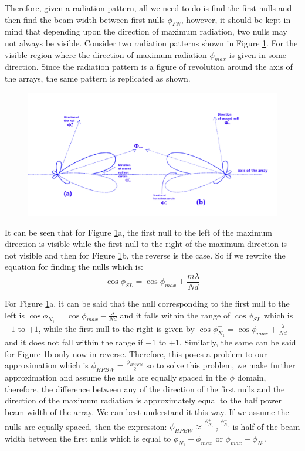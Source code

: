 Therefore, given a radiation pattern, all we need to do is find the first nulls and then find the beam width between first nulls $\phi_{FN}$, however, it should be kept in mind that depending upon the direction of maximum radiation, two nulls may not always be visible. Consider two radiation patterns shown in Figure \ref{54.2}. For the visible region where the direction of maximum radiation $\phi_{max}$ is given in some direction. Since the radiation pattern is a figure of revolution around the axis of the arrays, the same pattern is replicated as shown.
\begin{figure}[h]
\centering
\includegraphics[width=1\linewidth]{./graphics/fig54_2}
\caption{}
\label{54.2}
\end{figure}

It can be seen that for Figure \ref{54.2}a, the first null to the left of the maximum direction  is visible while the first null to the right of the maximum direction is not visible and then for Figure \ref{54.2}b, the reverse is the case. So if we rewrite the equation for finding the nulls which is:
\begin{equation}
\cos{\phi_{SL}} = \cos{\phi_{max}} \pm \frac{m \lambda}{N d} 
\end{equation}

For Figure \ref{54.2}a, it can be said that the null corresponding to the first null to the left is $\cos{\phi^+_{N_1}} = \cos{\phi_{max}} - \frac{ \lambda}{N d} $ and it falls within the range of $\cos{\phi_{SL}}$ which is $-1$ to $+1$, while the first null to the right is given by $\cos{\phi^-_{N_1}} = \cos{\phi_{max}} + \frac{ \lambda}{N d} $ and it does not fall within the range if $-1$ to $+1$. Similarly, the same can be said for Figure \ref{54.2}b only now in reverse. Therefore, this poses a problem to our approximation which is $\phi_{HPBW} = \frac{ \phi_{BWFN}}{2}$ so to solve this problem, we make further approximation and assume the nulls are equally spaced in the $\phi$  domain, therefore, the difference between any of the direction of the first nulls and the direction of the maximum radiation is approximately equal to the half power beam width of the array. We can best understand it this way. If we assume the nulls are equally spaced, then the expression:
$
\phi_{HPBW} \approx \frac{\phi^+_{N_1} - \phi^-_{N_1}}{2}
$
is half of the beam width between the first nulls which is equal to $\phi^+_{N_1} - \phi_{max}$ or  $\phi_{max} - \phi^-_{N_1}$.

